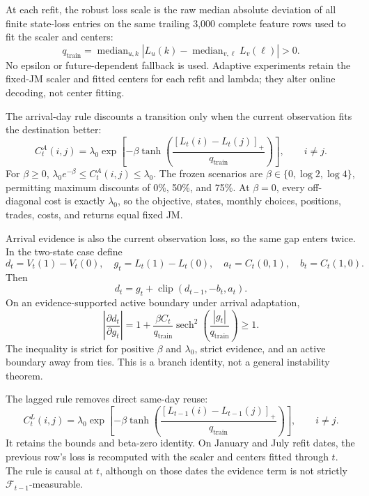 \documentclass[11pt]{article}
\newcommand{\sech}{\operatorname{sech}}
\newcommand{\F}{\mathcal{F}}
\begin{document}
At each refit, the robust loss scale is the raw median absolute deviation of
all finite state-loss entries on the same trailing 3,000 complete feature rows
used to fit the scaler and centers:
\begin{equation}
q_{\mathrm{train}}
=\operatorname{median}_{u,k}
\left|L_u(k)-\operatorname{median}_{v,\ell}L_v(\ell)\right|>0.
\label{eq:q}
\end{equation}
No epsilon or future-dependent fallback is used. Adaptive experiments retain
the fixed-JM scaler and fitted centers for each refit and lambda; they alter
online decoding, not center fitting.

The arrival-day rule discounts a transition only when the current observation
fits the destination better:
\begin{equation}
C^A_t(i,j)=\lambda_0\exp\!\left[
-\beta\tanh\!\left(
\frac{[L_t(i)-L_t(j)]_+}{q_{\mathrm{train}}}
\right)\right],\qquad i\ne j.
\label{eq:arrival}
\end{equation}
For \(\beta\ge0\),
\(\lambda_0e^{-\beta}\le C^A_t(i,j)\le\lambda_0\). The frozen scenarios are
\(\beta\in\{0,\log2,\log4\}\), permitting maximum discounts of 0\%, 50\%, and
75\%. At \(\beta=0\), every off-diagonal cost is exactly \(\lambda_0\), so the
objective, states, monthly choices, positions, trades, costs, and returns equal
fixed JM.

Arrival evidence is also the current observation loss, so the same gap enters
twice. In the two-state case define
\[
d_t=V_t(1)-V_t(0),\quad g_t=L_t(1)-L_t(0),\quad
a_t=C_t(0,1),\quad b_t=C_t(1,0).
\]
Then
\begin{equation}
d_t=g_t+\operatorname{clip}(d_{t-1},-b_t,a_t).
\label{eq:binary}
\end{equation}
On an evidence-supported active boundary under arrival adaptation,
\begin{equation}
\left|\frac{\partial d_t}{\partial g_t}\right|
=1+\frac{\beta C_t}{q_{\mathrm{train}}}
\sech^2\!\left(\frac{|g_t|}{q_{\mathrm{train}}}\right)\ge1.
\label{eq:amplification}
\end{equation}
The inequality is strict for positive \(\beta\) and \(\lambda_0\), strict
evidence, and an active boundary away from ties. This is a branch identity, not
a general instability theorem.

The lagged rule removes direct same-day reuse:
\begin{equation}
C^L_t(i,j)=\lambda_0\exp\!\left[
-\beta\tanh\!\left(
\frac{[L_{t-1}(i)-L_{t-1}(j)]_+}{q_{\mathrm{train}}}
\right)\right],\qquad i\ne j.
\label{eq:lagged}
\end{equation}
It retains the bounds and beta-zero identity. On January and July refit dates,
the previous row's loss is recomputed with the scaler and centers fitted through
\(t\). The rule is causal at \(t\), although on those dates the evidence term
is not strictly \(\F_{t-1}\)-measurable.
\end{document}
